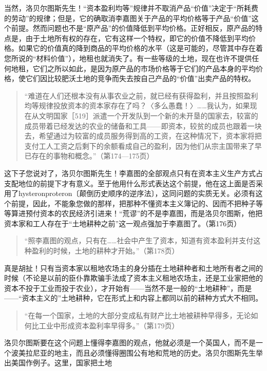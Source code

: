 当然，洛贝尔图斯先生！“资本盈利均等”规律并不取消产品“价值”决定于“所耗费的劳动”的规律；但是，它的确取消李嘉图关于产品的平均价格等于产品“价值”这个前提。然而问题也不是“原产品”的价值降低到平均价格。正好相反，原产品的特点是，由于土地所有权的存在，它有这样一个特权，即它的价值不降低到平均价格。如果它的价值真的降到商品的平均价格的水平（这是可能的，尽管其中存在着您所说的“材料价值”），地租也就消失了。有一些等级的土地，现在也许不提供任何地租，它们之所以如此，是因为原产品的市场价格等于它们的产品本身的平均价格，使它们因比较肥沃土地的竞争而失去按自己产品的“价值”出卖产品的特权。

\begin{quote}{“难道在人们还根本没有从事农业之前，就已经有获得盈利，并且按照盈利均等规律投放资本的资本家存在了吗？〈多么愚蠢！〉……我认为，如果现在从文明国家［519］派遣一个开发队到一个新的未开垦的国家去，较富的成员带着已经发达的农业的储备和工具——即资本，较贫的成员也跟着一块去，希望通过为较富的成员服务得到高的工资，在这种情况下，资本家将把支付工人工资之后剩下的余额看成自己的盈利，因为他们从宗主国带来了早已存在的事物和概念。”（第174—175页）}\end{quote}

这下子您说对了，洛贝尔图斯先生！李嘉图的全部观点只有在资本主义生产方式占支配地位的前提下才有意义。至于他用什么形式表达这个前提，他在这上面是否采用了hysteronproteron〔颠倒历史顺序的逆序法〕，这同问题的实质无关。必须有这个前提，因此，不能象您做的那样，把那种不懂资本主义簿记的、因而不把种子等等算进预付资本的农民经济引进来！“荒谬”的不是李嘉图，而是洛贝尔图斯，他把资本家和工人存在于“土地耕种之前”这一观点强加于李嘉图了。（第176页）

\begin{quote}{“照李嘉图的观点，只有在……社会中产生了资本，知道有资本盈利并支付这种盈利的时候，土地的耕种才开始。”（第178页）}\end{quote}

真是胡扯！只有当资本家以租地农场主的身分插在土地耕种者和土地所有者之间的时候（不论是以前的臣仆靠欺骗手法成了资本主义租地农场主，还是工业家把他的资本不投于工业而投于农业），才开始有——当然不是一般的“土地耕种”，而是——“资本主义的”土地耕种，它在形式上和内容上都同以前的耕种方式大不相同。

\begin{quote}{“在每一个国家，土地的大部分变成私有财产比土地被耕种早得多，无论如何比工业中形成资本盈利率早得多。”（第179页）}\end{quote}

洛贝尔图斯要在这个问题上懂得李嘉图的观点，他就必须是一个英国人，而不是一个波美拉尼亚的地主，而且必须懂得圈围公有地和荒地的历史。洛贝尔图斯先生举出美国作例子。这里，国家把土地

